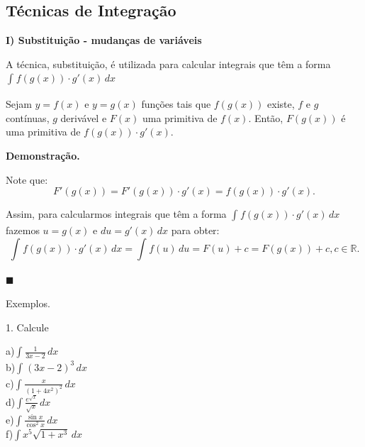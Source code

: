 \documentclass{article}
\begin{document}
{\begin{newpage}
\subsection{Técnicas de Integração}
\hspace{12pt}\textbf{I) Substituição - mudanças de variáveis}
\par A técnica, substituição, é utilizada para calcular integrais que têm a forma $\displaystyle{\int_{}^{}f(g(x))\cdot g'(x)\, dx}$
\par Sejam $y=f(x)$ e $y=g(x)$ funções tais que $f(g(x))$ existe, $f$ e $g$ contínuas, $g$ derivável e $F(x)$ uma primitiva de $f(x)$. Então, $F(g(x))$ é uma primitiva de $f(g(x))\cdot g'(x)$.
\par
\vspace{0.3cm}
\textbf{Demonstração.}
\par Note que:
\begin{equation*}\displaystyle{F'(g(x)) = F'(g(x))\cdot g'(x) = f(g(x))\cdot g'(x).}\end{equation*}
\par Assim, para calcularmos integrais que têm a forma $\displaystyle{\int_{}^{} f(g(x))\cdot g'(x)\, dx}$ fazemos $u=g(x)$ e $du=g'(x)\, dx$ para obter:
\begin{equation*} \displaystyle{\int_{}^{} f(g(x))\cdot g'(x)\, dx = \int_{}^{} f(u)\, du = F(u) + c = F(g(x)) + c, c\in\mathbb{R}}.\end{equation*}
\begin{flushright}$\blacksquare$\end{flushright}
\par
\vspace{0.3cm}
Exemplos.
\par
\begin{flushleft}
1. Calcule
\end{flushleft}
\par \begin{multicols}{4}
\hspace{-15pt}a)$\displaystyle{\int_{}^{} \frac{1}{3x-2}\, dx}$\\
b)$\displaystyle{\int_{}^{} (3x-2)^{3}}\, dx$\\
c)$\displaystyle{\int_{}^{} \frac{x}{(1 + 4x^{2})^{2}}\, dx}$\\
d)$\displaystyle{\int \frac{e^{\sqrt{x}}}{\sqrt{x}}\, dx}$\\
e)$\displaystyle{\int \frac{\sin{x}}{\cos^{2}{x}}\, dx}$\\   
f)$\displaystyle{\int x^{5}\sqrt{1 + x^{3}}\, dx}$\\

\end{multicols}
\end{newpage}}
\end{document}
